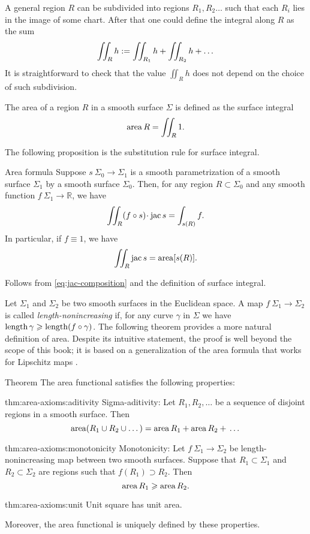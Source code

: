 A general region $R$ can be subdivided into regions $R_1,R_2\dots$ such that each $R_i$ lies in the image of some chart.
After that one could define the integral along $R$ as the sum
\[\iint_Rh
\mathrel{:=}
\iint_{R_1}h+\iint_{R_2}h+\dots\]
It is straightforward to check that the value $\iint_Rh$ does not depend on the choice of such subdivision.

The area of a region $R$ in a smooth surface $\Sigma$ is defined as the surface integral 
\[\mathop{\rm area}\nolimits R=\iint_R 1.\]

The following proposition is the substitution rule for surface integral.

\begin{thm}{Area formula}\label{prop:surface-integral}
Suppose $s\:\Sigma_0\to \Sigma_1$ is a smooth parametrization of a smooth surface $\Sigma_1$ by  a smooth surface $\Sigma_0$.
Then, for any region $R\subset \Sigma_0$ and any smooth function $f\:\Sigma_1\to\mathbb{R}$, we have
\[\iint_R (f\circ s)\cdot \jac  s=\int_{s(R)}f.\]
In particular, if $f\equiv 1$, we have
\[\iint_R \mathop{\rm jac}\nolimits  s=\mathop{\rm area}\nolimits [s(R)].\]

\end{thm}

Follows from \ref{eq:jac-composition} and the definition of surface integral.
\qeds

Let $\Sigma_1$ and $\Sigma_2$ be two smooth surfaces in the Euclidean space.
A map $f\:\Sigma_1\to \Sigma_2$ is called \emph{length-nonincreasing} if, for any curve $\gamma$ in $\Sigma$ we have $\mathop{\rm length}\nolimits\gamma\geqslant \mathop{\rm length}\nolimits (f\circ\gamma)$. 
The following theorem provides a more natural definition of area.
Despite its intuitive statement, the proof is well beyond the scope of this book;
it is based on a generalization of the area formula that works for Lipschitz maps \cite[3.2.3]{federer}. 

\begin{thm}{Theorem}\label{thm:area-axioms}
The area functional satisfies the following properties:

\begin{subthm}{thm:area-axioms:aditivity}
Sigma-aditivity: 
Let $R_1,R_2,\dots$ be a sequence of disjoint regions in a smooth surface.
Then 
\[\mathop{\rm area}\nolimits (R_1\cup R_2\cup \dots)=\mathop{\rm area}\nolimits R_1+ \mathop{\rm area}\nolimits R_2+{}\dots\]
\end{subthm}

\begin{subthm}{thm:area-axioms:monotonicity}
Monotonicity:
Let $f\:\Sigma_1\to \Sigma_2$ be length-nonincreasing map between two smooth surfaces.
Suppose that $R_1\subset \Sigma_1$ and $R_2\subset \Sigma_2$ are regions such that $f(R_1)\supset R_2$.
Then 
\[\mathop{\rm area}\nolimits R_1\geqslant \mathop{\rm area}\nolimits R_2.\]
\end{subthm}

\begin{subthm}{thm:area-axioms:unit}
Unit square has unit area. 
\end{subthm}

Moreover, the area functional is uniquely defined by these properties.
\end{thm}


